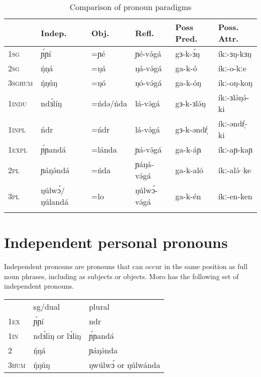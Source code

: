 \begin{table}
  \begin{tabular}{llllll}
    \lsptoprule
				&	Indep. 		& Obj. 			& Refl. 		&  Poss Pred. & Poss. Attr. \\
\midrule
1\textsc{sg}	&		ɲ́ɲí		&	=ɲé			&	ɲé-və́gá		& 	gɜ-k-ɜ́ŋ 	 & íkː-ɜŋ-kɜŋ \\
2\textsc{sg}	&	ŋ́ŋá			& 	=ŋá			& 	ŋá-və́gá		&	ga-k-ó	 & íkː-o-kːe \\
3\textsc{sghum}	&	ŋ́ŋúŋ			&	=ŋó			&	ŋó-və́gá		&	ga-k-óŋ	 & íkː-oŋ-koŋ\\
1\textsc{indu}	&	ndɜ́líŋ		&   =ńdə/ńda	& 	lá-və́gá		&   gɜ-k-ɜlə́ŋ	 & íkː-ɜlə́ŋə́-ki\\
1\textsc{inpl}	&	ńdr			&	=ńdr		& 	lá-və́gá		&   gɜ-k-əndŕ̩	 & íkː-əndŕ̩-ki \\
1\textsc{expl}	&	ɲ́ɲandá		&	=lánda		&	ɲá-və́gá		&   ga-k-áɲ 	 & íkː-aɲ-kaɲ \\
2\textsc{pl}	&	ɲáŋə́ndá 		&	=ńda 		&	ɲáŋá-və́gá	&	ga-k-aló	 & íkː-alə́--ke	\\
3\textsc{pl}	&	ŋúlwɔ́/ŋúlandá & =lo			& 	ŋúlwɔ́-və́gá 	&	ga-k-én 	 & íkː-en-ken \\
\lspbottomrule 
  \end{tabular}
  \caption{Comparison of pronoun paradigms}
  \label{tab:ch7:2}
\end{table}


\section{Independent personal pronouns}\label{sec:ch7:indep}

Independent pronouns are pronouns that can occur in the same position as full noun phrases, including as subjects or objects. Moro has the following set of independent pronouns.

\ea 
\begin{tabular}[t]{lll}
		 &	sg/dual & plural \\
1\textsc{ex}		&	ɲ́ɲí	& ndr\\
1\textsc{in} 	&	ndɜ́liŋ or lɜ́liŋ & ɲ́ɲandá\\
2		&	ŋ́ŋá	& ɲáŋə́nda \\
3\textsc{hum}	&	ŋ́ŋúŋ & ŋwúlwɔ́ or ŋúlwánda\\
\end{tabular}
\z

